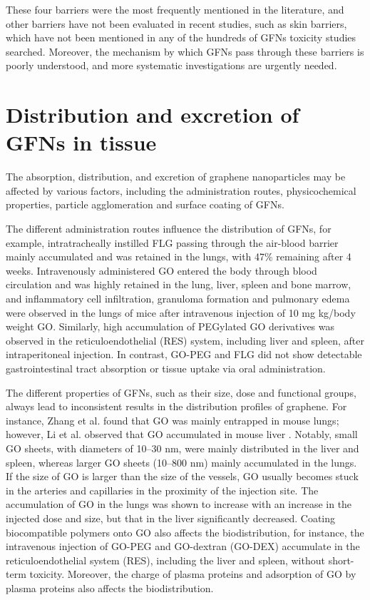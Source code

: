 \documentclass[twoside,twocolumn,9pt]{article}
\begin{document}
These four barriers were the most frequently mentioned in the literature, and other barriers have not been evaluated in recent studies, such as skin barriers, which have not been mentioned in any of the hundreds of GFNs toxicity studies searched. Moreover, the mechanism by which GFNs pass through these barriers is poorly understood, and more systematic investigations are urgently needed.

\section{Distribution and excretion of GFNs in tissue}
The absorption, distribution, and excretion of graphene nanoparticles may be affected by various factors, including the administration routes, physicochemical properties, particle agglomeration and surface coating of GFNs.

The different administration routes influence the distribution of GFNs, for example, intratracheally instilled FLG passing through the air-blood barrier mainly accumulated and was retained in the lungs, with 47\% remaining after 4 weeks. Intravenously administered GO entered the body through blood circulation and was highly retained in the lung, liver, spleen and bone marrow, and inflammatory cell infiltration, granuloma formation and pulmonary edema were observed in the lungs of mice after intravenous injection of 10 mg kg/body weight GO. Similarly, high accumulation of PEGylated GO derivatives was observed in the reticuloendothelial (RES) system, including liver and spleen, after intraperitoneal injection. In contrast, GO-PEG and FLG did not show detectable gastrointestinal tract absorption or tissue uptake via oral administration.

The different properties of GFNs, such as their size, dose and functional groups, always lead to inconsistent results in the distribution profiles of graphene. For instance, Zhang et al. found that GO was mainly entrapped in mouse lungs; however, Li et al. observed that GO accumulated in mouse liver . Notably, small GO sheets, with diameters of 10–30 nm, were mainly distributed in the liver and spleen, whereas larger GO sheets (10–800 nm) mainly accumulated in the lungs. If the size of GO is larger than the size of the vessels, GO usually becomes stuck in the arteries and capillaries in the proximity of the injection site. The accumulation of GO in the lungs was shown to increase with an increase in the injected dose and size, but that in the liver significantly decreased. Coating biocompatible polymers onto GO also affects the biodistribution, for instance, the intravenous injection of GO-PEG and GO-dextran (GO-DEX) accumulate in the reticuloendothelial system (RES), including the liver and spleen, without short-term toxicity. Moreover, the charge of plasma proteins and adsorption of GO by plasma proteins also affects the biodistribution.
\end{document}
